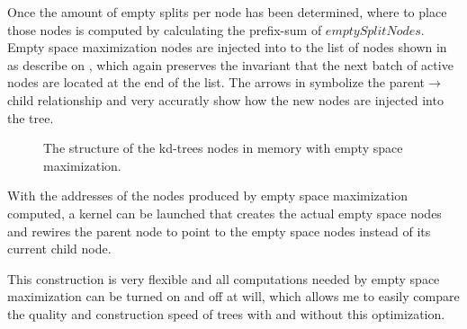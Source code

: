 Once the amount of empty splits per node has been determined, where to place
those nodes is computed by calculating the prefix-sum of
$emptySplitNodes$. Empty space maximization nodes are injected into to the list
of nodes shown in  as describe on
, which again preserves the invariant that the
next batch of active nodes are located at the end of the list. The arrows in
 symbolize the parent$\rightarrow$child
relationship and very accuratly show how the new nodes are injected into the
tree.

\begin{figure}
  \centering
  \caption{The structure of the kd-trees nodes in memory with empty
    space maximization.}
  \label{fig:emptyNodeStructure}
\end{figure}



With the addresses of the nodes produced by empty space maximization computed, a
kernel can be launched that creates the actual empty space nodes and rewires the
parent node to point to the empty space nodes instead of its current child node.

This construction is very flexible and all computations needed by empty space
maximization can be turned on and off at will, which allows me to easily compare
the quality and construction speed of trees with and without this optimization.

